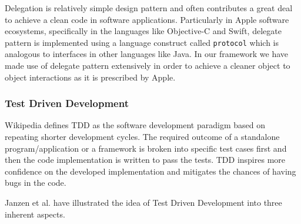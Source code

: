 \begin{itemize}
	\par Delegation is relatively simple design pattern and often contributes a great deal to achieve a clean code in software applications. Particularly in Apple software ecosystems, specifically in the languages like Objective-C and Swift, delegate pattern is implemented using a language construct called \texttt{protocol} \cite{wikidelegation} which is analogous to interfaces in other languages like Java. In our framework we have made use of delegate pattern extensively in order to achieve a cleaner object to object interactions as it is prescribed by Apple.
\end{itemize}

\subsubsection{Test Driven Development}
Wikipedia \cite{wikitdd} defines TDD as the software development paradigm based on repeating shorter development cycles. The required outcome of a standalone program/application or a framework is broken into specific test cases first and then the code implementation is written to pass the tests. TDD inspires more confidence on the developed implementation and mitigates the chances of having bugs in the code.
\par Janzen et al. \cite{janzen2005test} have illustrated the idea of Test Driven Development into three inherent aspects.
